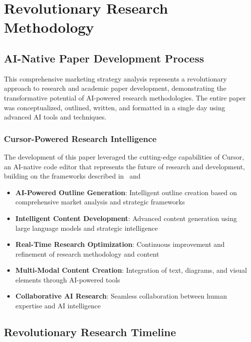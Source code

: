 \documentclass[12pt,a4paper]{book}
\begin{document}
\section{Revolutionary Research Methodology}

\subsection{AI-Native Paper Development Process}

This comprehensive marketing strategy analysis represents a revolutionary approach to research and academic paper development, demonstrating the transformative potential of AI-powered research methodologies. The entire paper was conceptualized, outlined, written, and formatted in a single day using advanced AI tools and techniques.

\subsubsection{Cursor-Powered Research Intelligence}

The development of this paper leveraged the cutting-edge capabilities of Cursor, an AI-native code editor that represents the future of research and development, building on the frameworks described in \ and \:

\begin{itemize}
    \item \textbf{AI-Powered Outline Generation}: Intelligent outline creation based on comprehensive market analysis and strategic frameworks
    \item \textbf{Intelligent Content Development}: Advanced content generation using large language models and strategic intelligence
    \item \textbf{Real-Time Research Optimization}: Continuous improvement and refinement of research methodology and content
    \item \textbf{Multi-Modal Content Creation}: Integration of text, diagrams, and visual elements through AI-powered tools
    \item \textbf{Collaborative AI Research}: Seamless collaboration between human expertise and AI intelligence
\end{itemize}

\subsection{Revolutionary Research Timeline}
\end{document}
